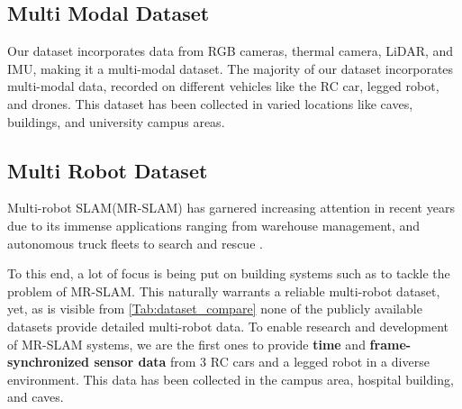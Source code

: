 \documentclass[10pt,twocolumn,letterpaper]{article}
\begin{document}
\subsection{Multi Modal Dataset}


Our dataset incorporates data from RGB cameras, thermal camera, LiDAR, and IMU, making it a multi-modal dataset. The majority of our dataset incorporates multi-modal data, recorded on different vehicles like the RC car, legged robot, and drones. This dataset has been collected in varied locations like caves, buildings, and university campus areas.





\subsection{Multi Robot Dataset}

Multi-robot SLAM(MR-SLAM) has garnered increasing attention in recent years due to its immense applications ranging from warehouse management, and autonomous truck fleets \cite{lajoie2022} to search and rescue \cite{9220149}. 

To this end, a lot of focus is being put on building systems such as \cite{https://doi.org/10.48550/arxiv.2205.13135}  to tackle the problem of MR-SLAM. This naturally warrants a reliable multi-robot dataset, yet, as is visible from \ref{Tab:dataset_compare} none of the publicly available datasets provide detailed multi-robot data. To enable research and development of MR-SLAM systems,  we are the first ones to provide \textbf{time} and \textbf{frame-synchronized sensor data} from 3 RC cars and a legged robot in a diverse environment. This data has been collected in the campus area, hospital building, and caves.
\end{document}
